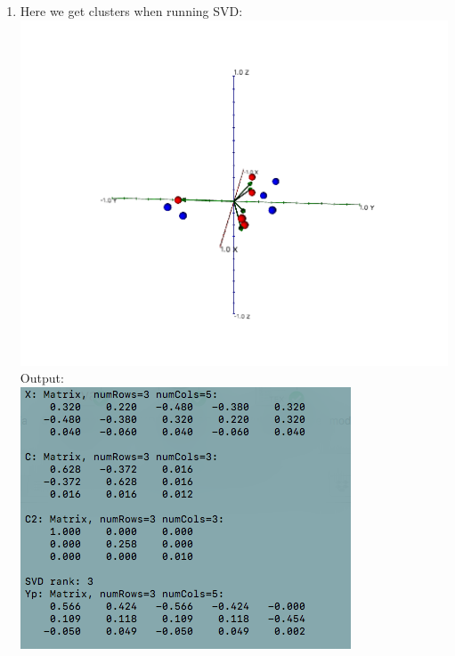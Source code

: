 \documentclass{article}
\begin{document}
\begin{enumerate}
\item Here we get clusters when running SVD: \\
\includegraphics[scale=0.4]{exercise18_plot}\\
Output: \\
\includegraphics[scale=0.6]{exercise18_output}

\end{enumerate}
\end{document}
